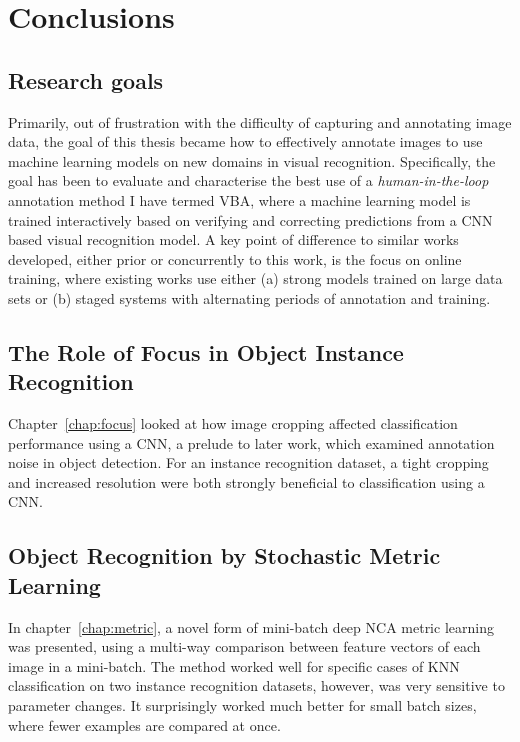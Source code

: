 \chapter{Conclusions}
\label{chap:conclusion} 

\glsresetall

\section{Research goals}
Primarily, out of frustration with the difficulty of capturing and annotating image data, the goal of this thesis became how to effectively annotate images to use machine learning models on new domains in visual recognition. Specifically, the goal has been to evaluate and characterise the best use of a \emph{human-in-the-loop} annotation method I have termed \gls{VBA}, where a machine learning model is trained interactively based on verifying and correcting predictions from a \gls{CNN} based visual recognition model. A key point of difference to similar works developed, either prior or concurrently to this work, is the focus on online training, where existing works use either (a) strong models trained on large data sets or (b) staged systems with alternating periods of annotation and training. 


\section{The Role of Focus in Object Instance Recognition}
Chapter~\ref{chap:focus} looked at how image cropping affected classification performance using a \gls{CNN}, a prelude to later work, which examined annotation noise in object detection. For an instance recognition dataset,  a tight cropping and increased resolution were both strongly beneficial to classification using a \gls{CNN}.

\section{Object Recognition by Stochastic Metric Learning}
In chapter~\ref{chap:metric}, a novel form of mini-batch deep \gls{NCA} metric learning was presented, using a multi-way comparison between feature vectors of each image in a mini-batch. The method worked well for specific cases of \gls{KNN} classification on two instance recognition datasets, however, was very sensitive to parameter changes. It surprisingly worked much better for small batch sizes, where fewer examples are compared at once. 



